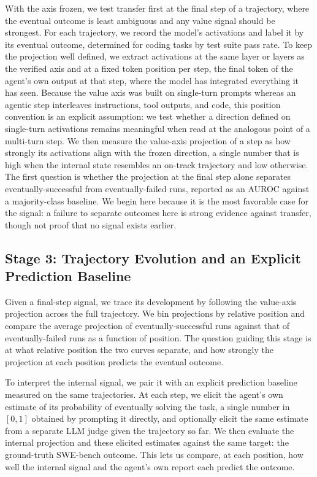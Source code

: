 \documentclass{article}
\begin{document}
With the axis frozen, we test transfer first at the final step of a trajectory, where the eventual outcome is least ambiguous and any value signal should be strongest. For each trajectory, we record the model's activations and label it by its eventual outcome, determined for coding tasks by test suite pass rate. To keep the projection well defined, we extract activations at the same layer or layers as the verified axis and at a fixed token position per step, the final token of the agent's own output at that step, where the model has integrated everything it has seen. Because the value axis was built on single-turn prompts whereas an agentic step interleaves instructions, tool outputs, and code, this position convention is an explicit assumption: we test whether a direction defined on single-turn activations remains meaningful when read at the analogous point of a multi-turn step. We then measure the value-axis projection of a step as how strongly its activations align with the frozen direction, a single number that is high when the internal state resembles an on-track trajectory and low otherwise. The first question is whether the projection at the final step alone separates eventually-successful from eventually-failed runs, reported as an AUROC against a majority-class baseline. We begin here because it is the most favorable case for the signal: a failure to separate outcomes here is strong evidence against transfer, though not proof that no signal exists earlier.

\subsection{Stage 3: Trajectory Evolution and an Explicit Prediction Baseline}

Given a final-step signal, we trace its development by following the value-axis projection across the full trajectory. We bin projections by relative position and compare the average projection of eventually-successful runs against that of eventually-failed runs as a function of position. The question guiding this stage is at what relative position the two curves separate, and how strongly the projection at each position predicts the eventual outcome.

To interpret the internal signal, we pair it with an explicit prediction baseline measured on the same trajectories. At each step, we elicit the agent's own estimate of its probability of eventually solving the task, a single number in $[0, 1]$ obtained by prompting it directly, and optionally elicit the same estimate from a separate LLM judge given the trajectory so far. We then evaluate the internal projection and these elicited estimates against the same target: the ground-truth SWE-bench outcome. This lets us compare, at each position, how well the internal signal and the agent's own report each predict the outcome.
\end{document}
